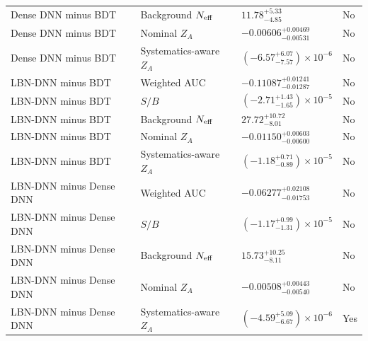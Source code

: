 \begin{table}[tb]
\begin{tabular}{llll}
    Dense DNN minus BDT & Background $N_{\rm eff}$ & $11.78^{+5.33}_{-4.85}$ & No \\
    Dense DNN minus BDT & Nominal $Z_A$ & $-0.00606^{+0.00469}_{-0.00531}$ & No \\
    Dense DNN minus BDT & Systematics-aware $Z_A$ & $(-6.57^{+6.07}_{-7.57})\times10^{-6}$ & No \\
    LBN-DNN minus BDT & Weighted AUC & $-0.11087^{+0.01241}_{-0.01287}$ & No \\
    LBN-DNN minus BDT & $S/B$ & $(-2.71^{+1.43}_{-1.65})\times10^{-5}$ & No \\
    LBN-DNN minus BDT & Background $N_{\rm eff}$ & $27.72^{+10.72}_{-8.01}$ & No \\
    LBN-DNN minus BDT & Nominal $Z_A$ & $-0.01150^{+0.00603}_{-0.00600}$ & No \\
    LBN-DNN minus BDT & Systematics-aware $Z_A$ & $(-1.18^{+0.71}_{-0.89})\times10^{-5}$ & No \\
    LBN-DNN minus Dense DNN & Weighted AUC & $-0.06277^{+0.02108}_{-0.01753}$ & No \\
    LBN-DNN minus Dense DNN & $S/B$ & $(-1.17^{+0.99}_{-1.31})\times10^{-5}$ & No \\
    LBN-DNN minus Dense DNN & Background $N_{\rm eff}$ & $15.73^{+10.25}_{-8.11}$ & No \\
    LBN-DNN minus Dense DNN & Nominal $Z_A$ & $-0.00508^{+0.00443}_{-0.00540}$ & No \\
    LBN-DNN minus Dense DNN & Systematics-aware $Z_A$ & $(-4.59^{+5.09}_{-6.67})\times10^{-6}$ & Yes \\
    \bottomrule
  \end{tabular}
\end{table}
